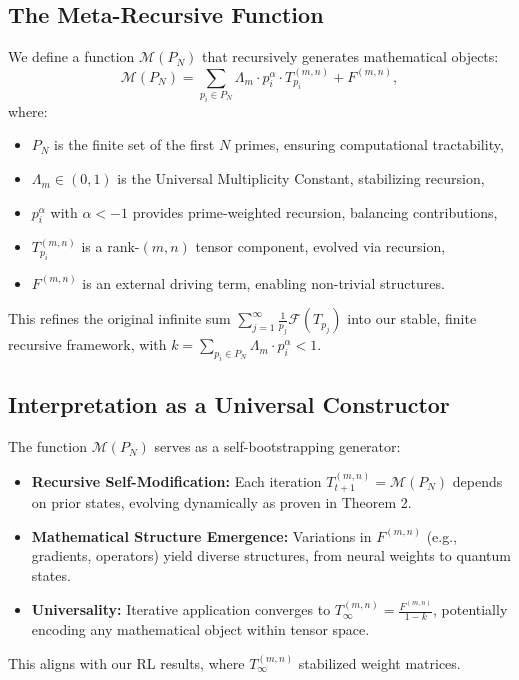 \documentclass{article}
\theoremstyle{plain}
\begin{document}
\subsection{The Meta-Recursive Function}
We define a function \( \mathcal{M}(P_N) \) that recursively generates mathematical objects:
\begin{equation}
    \mathcal{M}(P_N) = \sum_{p_i \in P_N} \Lambda_m \cdot p_i^\alpha \cdot T_{p_i}^{(m,n)} + F^{(m,n)},
\end{equation}
where:
\begin{itemize}
    \item \( P_N \) is the finite set of the first \( N \) primes, ensuring computational tractability,
    \item \( \Lambda_m \in (0, 1) \) is the Universal Multiplicity Constant, stabilizing recursion,
    \item \( p_i^\alpha \) with \( \alpha < -1 \) provides prime-weighted recursion, balancing contributions,
    \item \( T_{p_i}^{(m,n)} \) is a rank-$(m,n)$ tensor component, evolved via recursion,
    \item \( F^{(m,n)} \) is an external driving term, enabling non-trivial structures.
\end{itemize}
This refines the original infinite sum \( \sum_{j=1}^\infty \frac{1}{p_j} \mathcal{F}(T_{p_j}) \) into our stable, finite recursive framework, with \( k = \sum_{p_i \in P_N} \Lambda_m \cdot p_i^\alpha < 1 \).

\subsection{Interpretation as a Universal Constructor}
The function \( \mathcal{M}(P_N) \) serves as a self-bootstrapping generator:
\begin{itemize}
    \item \textbf{Recursive Self-Modification:} Each iteration \( T_{t+1}^{(m,n)} = \mathcal{M}(P_N) \) depends on prior states, evolving dynamically as proven in Theorem 2.
    \item \textbf{Mathematical Structure Emergence:} Variations in \( F^{(m,n)} \) (e.g., gradients, operators) yield diverse structures, from neural weights to quantum states.
    \item \textbf{Universality:} Iterative application converges to \( T_\infty^{(m,n)} = \frac{F^{(m,n)}}{1 - k} \), potentially encoding any mathematical object within tensor space.
\end{itemize}
This aligns with our RL results, where \( T_\infty^{(m,n)} \) stabilized weight matrices.
\end{document}
